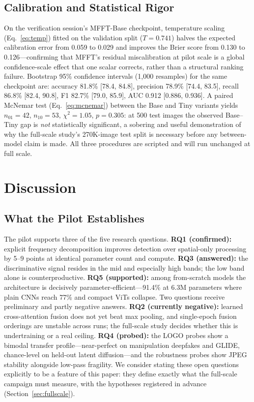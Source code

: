 \documentclass[journal]{IEEEtran}
\begin{document}
\subsection{Calibration and Statistical Rigor}
\label{sec:statprobes}
On the verification session's MFFT-Base checkpoint, temperature scaling (Eq.~\eqref{eq:temp}) fitted on the validation split ($T = 0.741$) halves the expected calibration error from 0.059 to 0.029 and improves the Brier score from 0.130 to 0.126---confirming that MFFT's residual miscalibration at pilot scale is a global confidence-scale effect that one scalar corrects, rather than a structural ranking failure. Bootstrap 95\% confidence intervals (1{,}000 resamples) for the same checkpoint are: accuracy 81.8\% [78.4, 84.8], precision 78.9\% [74.4, 83.5], recall 86.8\% [82.4, 90.8], F1 82.7\% [79.0, 85.9], AUC 0.912 [0.886, 0.936]. A paired McNemar test (Eq.~\eqref{eq:mcnemar}) between the Base and Tiny variants yields $n_{01}{=}42$, $n_{10}{=}53$, $\chi^2 = 1.05$, $p = 0.305$: at 500 test images the observed Base--Tiny gap is \emph{not} statistically significant, a sobering and useful demonstration of why the full-scale study's 270K-image test split is necessary before any between-model claim is made. All three procedures are scripted and will run unchanged at full scale.

\section{Discussion}
\label{sec:discussion}

\subsection{What the Pilot Establishes}
The pilot supports three of the five research questions. \textbf{RQ1 (confirmed):} explicit frequency decomposition improves detection over spatial-only processing by 5--9 points at identical parameter count and compute. \textbf{RQ3 (answered):} the discriminative signal resides in the mid and especially high bands; the low band alone is counterproductive. \textbf{RQ5 (supported):} among from-scratch models the architecture is decisively parameter-efficient---91.4\% at 6.3M parameters where plain CNNs reach 77\% and compact ViTs collapse. Two questions receive preliminary and partly negative answers. \textbf{RQ2 (currently negative):} learned cross-attention fusion does not yet beat max pooling, and single-epoch fusion orderings are unstable across runs; the full-scale study decides whether this is undertraining or a real ceiling. \textbf{RQ4 (probed):} the LOGO probes show a bimodal transfer profile---near-perfect on manipulation deepfakes and GLIDE, chance-level on held-out latent diffusion---and the robustness probes show JPEG stability alongside low-pass fragility. We consider stating these open questions explicitly to be a feature of this paper: they define exactly what the full-scale campaign must measure, with the hypotheses registered in advance (Section~\ref{sec:fullscale}).
\end{document}
